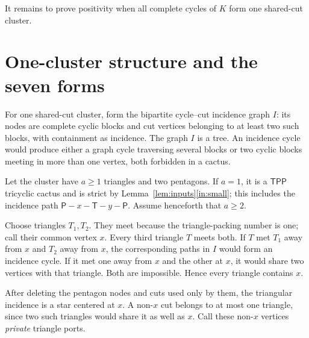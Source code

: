 \documentclass[11pt]{article}
\theoremstyle{remark}
\newcommand{\T}{\mathsf T}
\newcommand{\Pp}{\mathsf P}
\begin{document}
It remains to prove positivity when all complete cycles of $K$ form one
shared-cut cluster.

\section{One-cluster structure and the seven forms}\label{sec:structure}

For one shared-cut cluster, form the bipartite cycle--cut incidence graph $I$:
its nodes are complete cyclic blocks and cut vertices belonging to at least
two such blocks, with containment as incidence.  The graph $I$ is a tree.  An
incidence cycle would produce either a graph cycle traversing several blocks
or two cyclic blocks meeting in more than one vertex, both forbidden in a
cactus.

Let the cluster have $a\geq1$ triangles and two pentagons.  If $a=1$, it is a
$\T\Pp\Pp$ tricyclic cactus and is strict by
Lemma~\ref{lem:inputs}\ref{in:small}; this includes the incidence path
$\Pp-x-\T-y-\Pp$.  Assume henceforth that $a\geq2$.

Choose triangles $T_1,T_2$.  They meet because the triangle-packing number is
one; call their common vertex $x$.  Every third triangle $T$ meets both.  If
$T$ met $T_1$ away from $x$ and $T_2$ away from $x$, the corresponding paths
in $I$ would form an incidence cycle.  If it met one away from $x$ and the
other at $x$, it would share two vertices with that triangle.  Both are
impossible.  Hence every triangle contains $x$.

After deleting the pentagon nodes and cuts used only by them, the triangular
incidence is a star centered at $x$.  A non-$x$ cut belongs to at most one
triangle, since two such triangles would share it as well as $x$.  Call these
non-$x$ vertices \emph{private} triangle ports.
\end{document}
